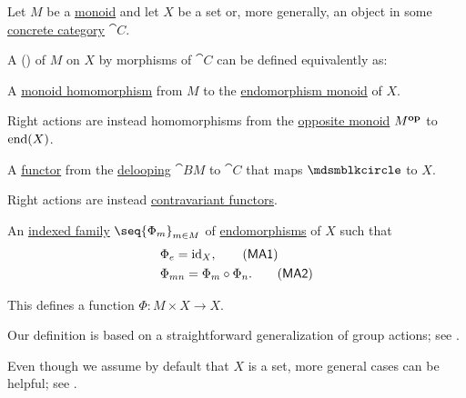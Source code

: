 \begin{definition}\label{def:monoid_action}\mimprovised
  Let \( M \) be a \hyperref[def:monoid]{monoid} and let \( X \) be a set or, more generally, an object in some \hyperref[def:concrete_category]{concrete category} \( \cat{C} \).

  A ()  of \( M \) on \( X \) by morphisms of \( \cat{C} \) can be defined equivalently as:
  \begin{thmenum}
     A \hyperref[def:monoid/homomorphism]{monoid homomorphism} from \( M \) to the \hyperref[def:endomorphism_monoid]{endomorphism monoid} of \( X \).

    Right actions are instead homomorphisms from the \hyperref[def:monoid/opposite]{opposite monoid} \( M^\oppos \) to \( \operatorname{end}(X) \).

     A \hyperref[def:functor]{functor} from the \hyperref[def:monoid_delooping]{delooping} \( \cat{B} M \) to \( \cat{C} \) that maps \( \Anon \) to \( X \).

    Right actions are instead \hyperref[rem:contravariant_functor]{contravariant functors}.

     An \hyperref[def:indexed_family]{indexed family} \( \seq{ \Phi_m }_{m \in M} \) of \hyperref[def:morphism_invertibility/endomorphism]{endomorphisms} of \( X \) such that
    \begin{align}
      &\Phi_e = \id_X,                     \label{eq:def:monoid_action/family/identity}\tag{\logic{MA1}} \\
      &\Phi_{mn} = \Phi_m \bincirc \Phi_n. \label{eq:def:monoid_action/family/compatibility}\tag{\logic{MA2}}
    \end{align}

    This defines a function \( \Phi: M \times X \to X \).
  \end{thmenum}
\end{definition}
\begin{comments}
  \item Our definition is based on a straightforward generalization of group actions; see .
  \item Even though we assume by default that \( X \) is a set, more general cases can be helpful; see .
\end{comments}
